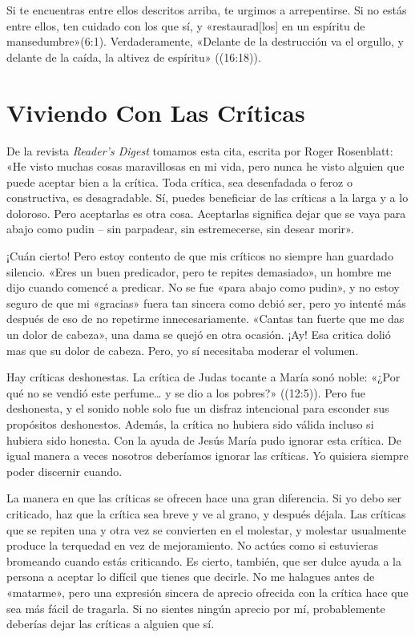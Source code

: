 \documentclass[12pt, twoside, openright]{book}
\begin{document}
Si te encuentras entre ellos descritos arriba, te urgimos a arrepentirse. Si no estás entre ellos, ten cuidado con los que sí, y «restaurad[los] en un espíritu de mansedumbre»(6:1). Verdaderamente, «Delante de la destrucción va el orgullo, y delante de la caída, la altivez de espíritu» ((16:18)).

\section{Viviendo Con Las Críticas}
De la revista \textit{Reader’s Digest} tomamos esta cita, escrita por Roger Rosenblatt: «He visto muchas cosas maravillosas en mi vida, pero nunca he visto alguien que puede aceptar bien a la crítica. Toda crítica, sea desenfadada o feroz o constructiva, es desagradable. Sí, puedes beneficiar de las críticas a la larga y a lo doloroso. Pero aceptarlas es otra cosa. Aceptarlas significa dejar que se vaya para abajo como pudin – sin parpadear, sin estremecerse, sin desear morir».

¡Cuán cierto! Pero estoy contento de que mis críticos no siempre han guardado silencio. «Eres un buen predicador, pero te repites demasiado», un hombre me dijo cuando comencé a predicar. No se fue «para abajo como pudin», y no estoy seguro de que mi «gracias» fuera tan sincera como debió ser, pero yo intenté más después de eso de no repetirme innecesariamente. «Cantas tan fuerte que me das un dolor de cabeza», una dama se quejó en otra ocasión. ¡Ay! Esa critica dolió mas que su dolor de cabeza. Pero, yo sí necesitaba moderar el volumen. 

Hay críticas deshonestas. La crítica de Judas tocante a María sonó noble: «¿Por qué no se vendió este perfume… y se dio a los pobres?» ((12:5)). Pero fue deshonesta, y el sonido noble solo fue un disfraz intencional para esconder sus propósitos deshonestos. Además, la crítica no hubiera sido válida incluso si hubiera sido honesta. Con la ayuda de Jesús María pudo ignorar esta crítica. De igual manera a veces nosotros deberíamos ignorar las críticas. Yo quisiera siempre poder discernir cuando. 

La manera en que las críticas se ofrecen hace una gran diferencia. Si yo debo ser criticado, haz que la crítica sea breve y ve al grano, y después déjala. Las críticas que se repiten una y otra vez se convierten en el molestar, y molestar usualmente produce la terquedad en vez de mejoramiento. No actúes como si estuvieras bromeando cuando estás criticando. Es cierto, también, que ser dulce ayuda a la persona a aceptar lo difícil que tienes que decirle. No me halagues antes de «matarme», pero una expresión sincera de aprecio ofrecida con la crítica hace que sea más fácil de tragarla. Si no sientes ningún aprecio por mí, probablemente deberías dejar las críticas a alguien que sí. 
\end{document}
